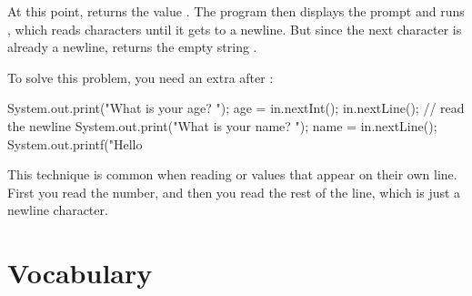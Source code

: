 At this point,  returns the value .
The program then displays the prompt  and runs , which reads characters until it gets to a newline.
But since the next character is already a newline,  returns the empty string .

To solve this problem, you need an extra  after :

\begin{code}
System.out.print("What is your age? ");
age = in.nextInt();
in.nextLine();  // read the newline
System.out.print("What is your name? ");
name = in.nextLine();
System.out.printf("Hello %
\end{code}

This technique is common when reading  or  values that appear on their own line.
First you read the number, and then you read the rest of the line, which is just a newline character.



\section{Vocabulary}

